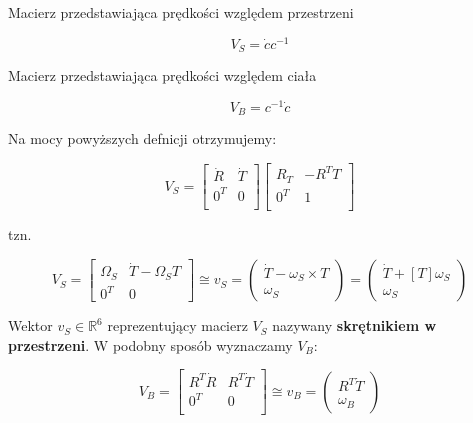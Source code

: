 \documentclass{article}
\begin{document}
Macierz przedstawiająca prędkości względem przestrzeni

$$
    V_{S} = \dot c c^{-1}
$$



Macierz przedstawiająca prędkości względem ciała

$$
    V_{B} = c^{-1} \dot c
$$

Na mocy powyższych defnicji otrzymujemy:

$$
    V_{S}=
    \begin{bmatrix}
        \dot R & \dot T \\[0.3em]
        0^{T}  & 0      \\[0.3em]
    \end{bmatrix}
    \begin{bmatrix}
        R_{T} & -R^{T}T \\[0.3em]
        0^{T} & 1       \\[0.3em]
    \end{bmatrix}
$$


tzn.

$$
    V_{S}=
    \begin{bmatrix}
        \Omega_{S} & \dot T-\Omega_{S}T \\[0.3em]
        0^{T}      & 0
    \end{bmatrix}
    \cong
    v_{S}
    =
    \begin{pmatrix}
        \dot T-\omega_{S}\times T \\[0.3em]
        \omega_{S}
    \end{pmatrix}
    =
    \begin{pmatrix}
        \dot T + \left[T\right]\omega_{S} \\[0.3em]
        \omega_{S}
    \end{pmatrix}
$$

\newpage

Wektor $v_{S} \in \mathbb{R}^{6}$ reprezentujący macierz $V_{S}$ nazywany {\bf skrętnikiem w przestrzeni}. W podobny sposób wyznaczamy $V_{B}$:

$$
    V_{B}=
    \begin{bmatrix}
        R^{T}\dot R & R^{T}\dot T \\[0.3em]
        0^{T}       & 0           \\[0.3em]
    \end{bmatrix}
    \cong
    v_{B}
    =
    \begin{pmatrix}
        R^{T}\dot T \\[0.3em]
        \omega_{B}
    \end{pmatrix}
$$
\end{document}
